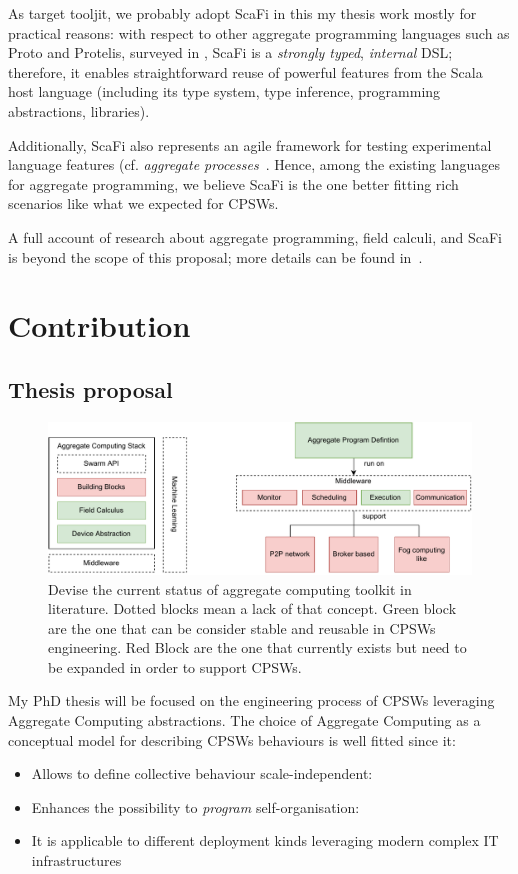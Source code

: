 \documentclass[11pt]{article}
\begin{document}
As target tooljit, we probably adopt ScaFi in this my thesis work mostly for practical reasons: with respect to other aggregate programming languages such as Proto and Protelis, surveyed in \cite{viroli2019jlamp-si-coord},
ScaFi is a \emph{strongly typed}, \emph{internal} DSL; therefore, it enables straightforward reuse of powerful features from the Scala host language (including its type system, type inference, programming abstractions, libraries).

Additionally, ScaFi also represents an agile framework for testing experimental language features (cf. \emph{aggregate processes}~\cite{DBLP:journals/eaai/CasadeiVAPD21}.
%
Hence, among the existing languages for aggregate programming, we believe ScaFi is the one better fitting rich scenarios like what we expected for CPSWs.

A full account of research about aggregate programming, field calculi, and ScaFi is beyond the scope of this proposal; more details can be found in~\cite{viroli2019jlamp-si-coord,DBLP:journals/eaai/CasadeiVAPD21}.

\section{Contribution} \label{contribution}
\subsection{Thesis proposal}
\begin{figure}
	\centering
	\includegraphics[width=\textwidth]{img/to-do-for-thesis.pdf}
	\caption{Devise the current status of aggregate computing toolkit in literature. Dotted blocks mean a lack of that concept. Green block are the one that can be consider stable and reusable in CPSWs engineering. Red Block are the one that currently exists but need to be expanded in order to support CPSWs.}
	\label{fig:current-state}
\end{figure}
My PhD thesis will be focused on the engineering process of CPSWs leveraging Aggregate Computing abstractions. The choice of Aggregate Computing as a conceptual model for describing CPSWs behaviours is well fitted since it:
\begin{itemize}
	\item Allows to define collective behaviour scale-independent:
	\item Enhances the possibility to \textit{program} self-organisation:
	\item It is applicable to different deployment kinds leveraging modern complex IT infrastructures
\end{itemize}
\end{document}
